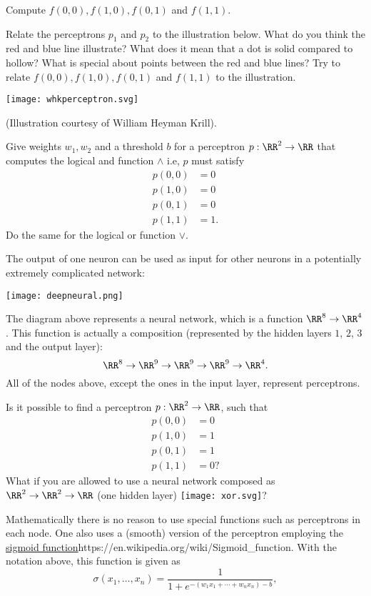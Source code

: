 \documentclass{article}
\begin{document}
Compute
$f(0, 0), f(1, 0), f(0, 1)$ and $f(1, 1)$.



Relate the perceptrons $ p_1 $ and $ p_2 $ to the illustration
below. What do you think the red and blue line illustrate?  What does
it mean that a dot is solid compared to hollow? What is special
about points between the red and blue lines?  Try to relate $f(0,0),
f(1,0), f(0,1)$ and $f(1,1)$ to the illustration.

\texttt{[image: whkperceptron.svg]}

(Illustration courtesy of William Heyman Krill).

\endshex

  \beginshex
  Give weights $w_1, w_2$ and a threshold $b$ for a perceptron $p:\RR^2\rightarrow \RR$ that computes
  the logical and function $\land$ i.e, $p$ must satisfy
  \begin{align*}
    p(0,0) &= 0\\
    p(1, 0) &= 0\\
    p(0,1) &= 0\\
     p(1, 1) &= 1.
  \end{align*}
  Do the same for the logical or function $\lor$.
  \endshex
  
  The output of one neuron can be used as input for other neurons in a potentially extremely complicated network:

  \texttt{[image: deepneural.png]}

  The diagram above represents a neural network, which is a function $\RR^8\rightarrow \RR^4$. This function
  is actually a composition (represented by the hidden layers $1$, $2$, $3$ and the output layer):
  $$
  \RR^8\rightarrow \RR^9 \rightarrow \RR^9 \rightarrow \RR^9 \rightarrow \RR^4.
  $$
  All of the nodes above, except the ones in the input layer, represent perceptrons.

  \beginshex 
  Is it possible to find a perceptron $p:\RR^2\rightarrow \RR$, such that
    \begin{align*}
    p(0,0) &= 0\\
    p(1, 0) &= 1\\
    p(0,1) &= 1\\
     p(1, 1) &= 0?
  \end{align*}
  What if you are allowed to use a neural network composed as $\RR^2\rightarrow \RR^2\rightarrow \RR$ (one hidden layer)
  \texttt{[image: xor.svg]}?
  \endshex
  
  Mathematically there is no reason to use special functions such as perceptrons in each node. One also uses
  a (smooth) version of the perceptron employing the \url{sigmoid function}{https://en.wikipedia.org/wiki/Sigmoid_function}.
  With the notation above, this function is given as
  $$
  \sigma(x_1, \dots, x_n) = \frac{1}{1 + e^{-(w_1 x_1 + \cdots + w_n x_n) - b}},
  $$
\end{document}
